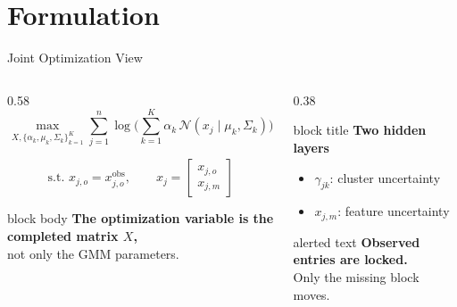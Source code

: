\section{Formulation}

\begin{frame}[shrink=3]{Joint Optimization View}
    \begin{columns}[T,onlytextwidth]
        \begin{column}{0.58\textwidth}
            \[
                \max_{X,\{\alpha_k,\mu_k,\Sigma_k\}_{k=1}^{K}}
                \sum_{j=1}^{n}
                \log\Bigg(
                \sum_{k=1}^{K}\alpha_k \,
                \mathcal{N}(x_j \mid \mu_k, \Sigma_k)
                \Bigg)
            \]

            \[
                \text{s.t. } x_{j,o}=x_{j,o}^{\mathrm{obs}},\qquad
                x_j=\begin{bmatrix}x_{j,o}\\x_{j,m}\end{bmatrix}
            \]

            \vspace{0.25cm}
            \begin{beamercolorbox}[sep=0.8em, rounded=true, shadow=true]{block body}
                \large
                \textbf{The optimization variable is the completed matrix \(X\),}\\
                not only the GMM parameters.
            \end{beamercolorbox}
        \end{column}
        \begin{column}{0.38\textwidth}
            \begin{beamercolorbox}[sep=0.9em, rounded=true, shadow=true]{block title}
                \textbf{Two hidden layers}
            \end{beamercolorbox}
            \vspace{0.15cm}
            \begin{itemize}
                \item \(\gamma_{jk}\): cluster uncertainty
                \item \(x_{j,m}\): feature uncertainty
            \end{itemize}

            \vspace{0.25cm}
            \begin{beamercolorbox}[sep=0.8em, rounded=true, shadow=true]{alerted text}
                \textbf{Observed entries are locked.}\\
                Only the missing block moves.
            \end{beamercolorbox}
        \end{column}
    \end{columns}
\end{frame}


